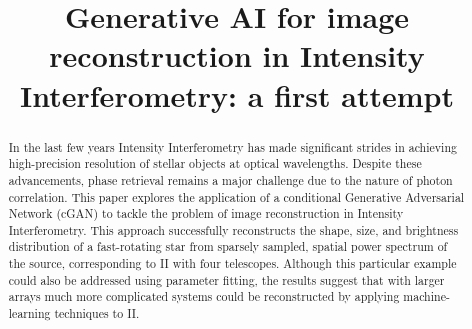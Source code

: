 \documentclass[fleqn,usenatbib,twocolumn]{mnras}
\title{Generative AI for image reconstruction in Intensity Interferometry: a first attempt}
\date{}
\begin{document}
\maketitle

\begin{abstract}
In the last few years Intensity Interferometry has made significant strides in achieving high-precision resolution of stellar objects at optical wavelengths. Despite these advancements, phase retrieval remains a major challenge due to the nature of photon correlation. This paper explores the application of a conditional Generative Adversarial Network (cGAN) to tackle the problem of image reconstruction in Intensity Interferometry. This approach successfully reconstructs the shape, size, and brightness distribution of a fast-rotating star from sparsely sampled, spatial power spectrum of the source, corresponding to II with four telescopes.  Although this particular example could also be addressed using parameter fitting, the results suggest that with larger arrays much more complicated systems could be reconstructed by applying machine-learning techniques to II.
\end{abstract}









\end{document}

